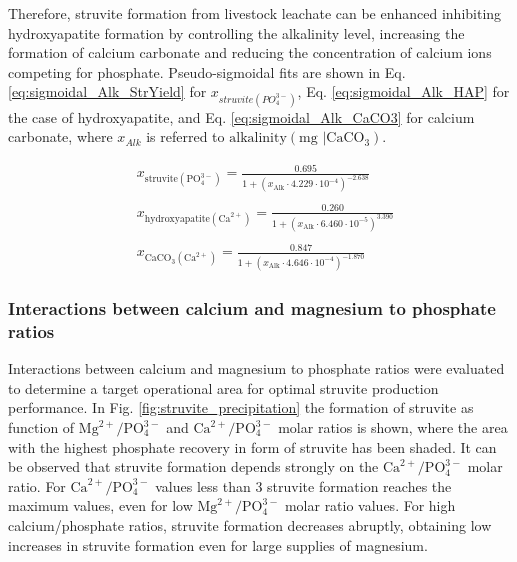 \begin{refsection}[referencesCh3]
Therefore, struvite formation from livestock leachate can be enhanced inhibiting hydroxyapatite formation by controlling the alkalinity level, increasing the formation of calcium carbonate and reducing the concentration of calcium ions competing for phosphate. 
Pseudo-sigmoidal fits are shown in Eq. \ref{eq:sigmoidal_Alk_StrYield} for $x_{struvite \left(PO_{4}^{3-}\right)}$, Eq. \ref{eq:sigmoidal_Alk_HAP} for the case of hydroxyapatite, and Eq. \ref{eq:sigmoidal_Alk_CaCO3} for calcium carbonate, where $ x_{Alk}$ is referred to $\text{alkalinity} \left( \text{mg } |\text{CaCO}_{3}\right)$.

\begin{align}
& x_{\text{struvite} \left(\text{PO}_{4}^{3-}\right)} = \frac{0.695}{1+\left(x_{\text{Alk}} \cdot 4.229 \cdot 10^{-4}\right)^{-2.638}} \label{eq:sigmoidal_Alk_StrYield} \\
\nonumber \\
& x_{\text{hydroxyapatite} \left(\text{Ca}^{2+}\right)} = \frac{0.260}{1+\left(x_{\text{Alk}} \cdot 6.460 \cdot 10^{-5}\right)^{3.390}} \label{eq:sigmoidal_Alk_HAP} \\
\nonumber \\
& x_{\text{CaCO}_{3} \left(\text{Ca}^{2+}\right)} = \frac{0.847}{1+\left(x_{\text{Alk}} \cdot 4.646 \cdot 10^{-4}\right)^{-1.870}} \label{eq:sigmoidal_Alk_CaCO3}
\end{align}

\subsubsection{Interactions between calcium and magnesium to phosphate ratios}
Interactions between calcium and magnesium to phosphate ratios were evaluated to determine a target operational area for optimal struvite production performance. In Fig. \ref{fig:struvite_precipitation} the formation of struvite as function of $\text{Mg}^{2+}/\text{PO}_{4}^{3-}$ and $\text{Ca}^{2+}/\text{PO}_{4}^{3-}$ molar ratios is shown, where the area with the highest phosphate recovery in form of struvite has been shaded. It can be observed that struvite formation depends strongly on the $\text{Ca}^{2+}/\text{PO}_{4}^{3-}$ molar ratio. For $\text{Ca}^{2+}/\text{PO}_{4}^{3-}$ values less than 3 struvite formation reaches the maximum values, even for low $\text{Mg}^{2+}/\text{PO}_{4}^{3-}$ molar ratio values. For high calcium/phosphate ratios, struvite formation decreases abruptly, obtaining low increases in struvite formation  even for large supplies of magnesium.


\end{refsection}
